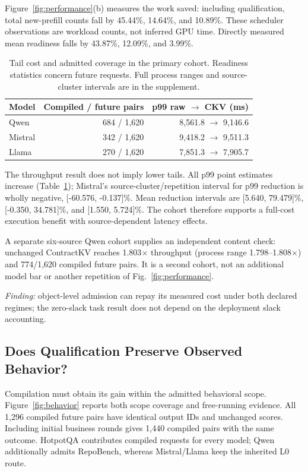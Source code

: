 Figure~\ref{fig:performance}(b) measures the work saved: including qualification, total new-prefill counts fall by 45.44\%, 14.64\%, and 10.89\%. These scheduler observations are workload counts, not inferred GPU time. Directly measured mean readiness falls by 43.87\%, 12.09\%, and 3.99\%.

\begin{table}[t]
\centering\small
\caption{Tail cost and admitted coverage in the primary cohort. Readiness statistics concern future requests. Full process ranges and source-cluster intervals are in the supplement.}
\label{tab:primary}
\begin{tabular}{@{}lrr@{}}
\toprule
Model & Compiled / future pairs & p99 raw $\rightarrow$ CKV (ms)\\
\midrule
Qwen & 684 / 1,620 & 8,561.8 $\rightarrow$ 9,146.6\\
Mistral & 342 / 1,620 & 9,418.2 $\rightarrow$ 9,511.3\\
Llama & 270 / 1,620 & 7,851.3 $\rightarrow$ 7,905.7\\
\bottomrule
\end{tabular}
\end{table}

The throughput result does not imply lower tails. All p99 point estimates increase (Table~\ref{tab:primary}); Mistral's source-cluster/repetition interval for p99 reduction is wholly negative, [-60.576, -0.137]\%. Mean reduction intervals are [5.640, 79.479]\%, [-0.350, 34.781]\%, and [1.550, 5.724]\%. The cohort therefore supports a full-cost execution benefit with source-dependent latency effects.

A separate six-source Qwen cohort supplies an independent content check: unchanged ContractKV reaches 1.803$\times$ throughput (process range 1.798--1.808$\times$) and 774/1,620 compiled future pairs. It is a second cohort, not an additional model bar or another repetition of Fig.~\ref{fig:performance}.

\noindent\emph{Finding:} object-level admission can repay its measured cost under both declared regimes; the zero-slack task result does not depend on the deployment slack accounting.

\subsection{Does Qualification Preserve Observed Behavior?}
\label{sec:quality}
Compilation must obtain its gain within the admitted behavioral scope. Figure~\ref{fig:behavior} reports both scope coverage and free-running evidence. All 1,296 compiled future pairs have identical output IDs and unchanged scores. Including initial business rounds gives 1,440 compiled pairs with the same outcome. HotpotQA contributes compiled requests for every model; Qwen additionally admits RepoBench, whereas Mistral/Llama keep the inherited L0 route.

